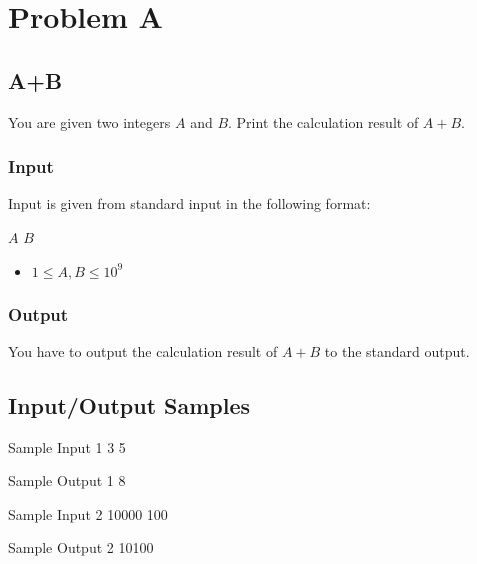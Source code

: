 \documentclass[11pt,a4paper]{article}
\begin{document}
\section{Problem A}

\subsection{A+B}

You are given two integers $A$ and $B$. Print the calculation result of $A + B$.

\subsubsection{Input}

Input is given from standard input in the following format:

\begin{screen}
$A$ $B$
\end{screen}

\begin{itemize}
    \item $1 \leq A, B \leq 10^{9}$
\end{itemize}

\subsubsection{Output}

You have to output the calculation result of $A + B$ to the standard output.


\subsection{ Input/Output Samples }



\begin{itembox}[l]{ Sample Input 1 }
3 5

\end{itembox}



\begin{itembox}[l]{ Sample Output 1 }
8

\end{itembox}







\begin{itembox}[l]{ Sample Input 2 }
10000 100

\end{itembox}



\begin{itembox}[l]{ Sample Output 2 }
10100

\end{itembox}
\end{document}
